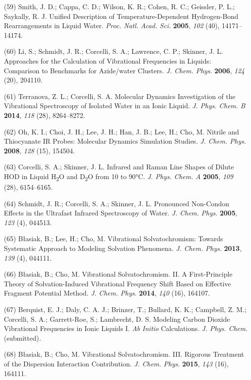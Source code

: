 \documentclass[]{article}
\begin{document}
(59) Smith, J. D.; Cappa, C. D.; Wilson, K. R.; Cohen, R. C.; Geissler,
P. L.; Saykally, R. J. Unified Description of Temperature-Dependent
Hydrogen-Bond Rearrangements in Liquid Water. \emph{Proc. Natl. Acad.
Sci.} \textbf{2005}, \emph{102} (40), 14171--14174.

(60) Li, S.; Schmidt, J. R.; Corcelli, S. A.; Lawrence, C. P.; Skinner,
J. L. Approaches for the Calculation of Vibrational Frequencies in
Liquids: Comparison to Benchmarks for Azide/water Clusters. \emph{J.
Chem. Phys.} \textbf{2006}, \emph{124} (20), 204110.

(61) Terranova, Z. L.; Corcelli, S. A. Molecular Dynamics Investigation
of the Vibrational Spectroscopy of Isolated Water in an Ionic Liquid.
\emph{J. Phys. Chem. B} \textbf{2014}, \emph{118} (28), 8264--8272.

(62) Oh, K. I.; Choi, J. H.; Lee, J. H.; Han, J. B.; Lee, H.; Cho, M.
Nitrile and Thiocyanate IR Probes: Molecular Dynamics Simulation
Studies. \emph{J. Chem. Phys.} \textbf{2008}, \emph{128} (15), 154504.

(63) Corcelli, S. A.; Skinner, J. L. Infrared and Raman Line Shapes of
Dilute HOD in Liquid H\textsubscript{2}O and D\textsubscript{2}O from 10
to 90°C. \emph{J. Phys. Chem. A} \textbf{2005}, \emph{109} (28),
6154--6165.

(64) Schmidt, J. R.; Corcelli, S. A.; Skinner, J. L. Pronounced
Non-Condon Effects in the Ultrafast Infrared Spectroscopy of Water.
\emph{J. Chem. Phys.} \textbf{2005}, \emph{123} (4), 044513.

(65) Błasiak, B.; Lee, H.; Cho, M. Vibrational Solvatochromism: Towards
Systematic Approach to Modeling Solvation Phenomena. \emph{J. Chem.
Phys.} \textbf{2013}, \emph{139} (4), 044111.

(66) Błasiak, B.; Cho, M. Vibrational Solvatochromism. II. A
First-Principle Theory of Solvation-Induced Vibrational Frequency Shift
Based on Effective Fragment Potential Method. \emph{J. Chem. Phys.}
\textbf{2014}, \emph{140} (16), 164107.

(67) Berquist, E. J.; Daly, C. A. J.; Brinzer, T.; Bullard, K. K.;
Campbell, Z. M.; Corcelli, S. A.; Garrett-Roe, S.; Lambrecht, D. S.
Modeling Carbon Dioxide Vibrational Frequencies in Ionic Liquids I.
\emph{Ab Initio} Calculations. \emph{J. Phys. Chem.} (submitted)\emph{.}

(68) Błasiak, B.; Cho, M. Vibrational Solvatochromism. III. Rigorous
Treatment of the Dispersion Interaction Contribution. \emph{J. Chem.
Phys.} \textbf{2015}, \emph{143} (16), 164111.
\end{document}
